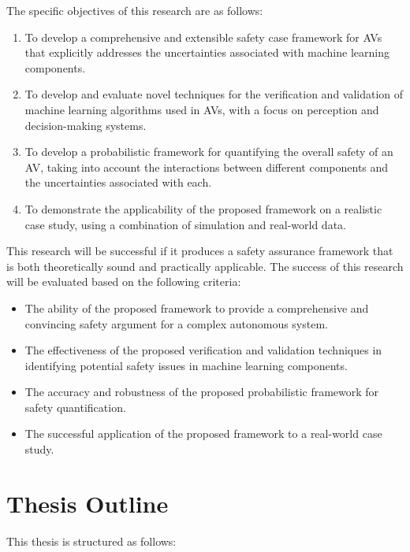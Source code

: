 The specific objectives of this research are as follows:

\begin{enumerate}
    \item To develop a comprehensive and extensible safety case framework for AVs that explicitly addresses the uncertainties associated with machine learning components.
    \item To develop and evaluate novel techniques for the verification and validation of machine learning algorithms used in AVs, with a focus on perception and decision-making systems.
    \item To develop a probabilistic framework for quantifying the overall safety of an AV, taking into account the interactions between different components and the uncertainties associated with each.
    \item To demonstrate the applicability of the proposed framework on a realistic case study, using a combination of simulation and real-world data.
\end{enumerate}

This research will be successful if it produces a safety assurance framework that is both theoretically sound and practically applicable. The success of this research will be evaluated based on the following criteria:

\begin{itemize}
    \item The ability of the proposed framework to provide a comprehensive and convincing safety argument for a complex autonomous system.
    \item The effectiveness of the proposed verification and validation techniques in identifying potential safety issues in machine learning components.
    \item The accuracy and robustness of the proposed probabilistic framework for safety quantification.
    \item The successful application of the proposed framework to a real-world case study.
\end{itemize}

\section{Thesis Outline}

This thesis is structured as follows:

